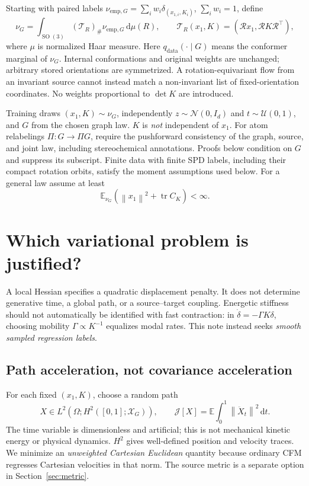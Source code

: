 \documentclass[11pt,letterpaper]{article}
\newcommand{\E}{\mathbb E}
\newcommand{\X}{\mathcal X_G}
\newcommand{\cN}{\mathcal N}
\newcommand{\tr}{\operatorname{tr}}
\newcommand{\SO}{\operatorname{SO}(3)}
\newcommand{\dd}{\,\mathrm d}
\newcommand{\norm}[1]{\left\lVert#1\right\rVert}
\newcommand{\J}{\mathcal J}
\begin{document}
Starting with paired labels $\nu_{\mathrm{emp},G}=\sum_iw_i\delta_{(x_{1,i},K_i)}$, $\sum_iw_i=1$, define
\begin{equation}
\nu_G=\int_{\SO}(\mathcal T_R)_\#\nu_{\mathrm{emp},G}\dd\mu(R),\qquad
\mathcal T_R(x_1,K)=(\mathcal Rx_1,\mathcal RK\mathcal R^\top),
\label{eq:joint}
\end{equation}
where $\mu$ is normalized Haar measure. Here $q_{\mathrm{data}}(\cdot\mid G)$ means the conformer marginal of $\nu_G$. Internal conformations and original weights are unchanged; arbitrary stored orientations are symmetrized. A rotation-equivariant flow from an invariant source cannot instead match a non-invariant list of fixed-orientation coordinates. No weights proportional to $\det K$ are introduced.

Training draws $(x_1,K)\sim\nu_G$, independently $z\sim\cN(0,I_d)$ and $t\sim\mathcal U(0,1)$, and $G$ from the chosen graph law. $K$ is \emph{not} independent of $x_1$. For atom relabelings $\Pi:G\to\Pi G$, require the pushforward consistency of the graph, source, and joint law, including stereochemical annotations. Proofs below condition on $G$ and suppress its subscript. Finite data with finite SPD labels, including their compact rotation orbits, satisfy the moment assumptions used below. For a general law assume at least
\begin{equation}
\E_{\nu_G}(\norm{x_1}^2+\tr C_K)<\infty.
\label{eq:moments}
\end{equation}

\section{Which variational problem is justified?}
\label{sec:objective}

A local Hessian specifies a quadratic displacement penalty. It does not determine generative time, a global path, or a source--target coupling. Energetic stiffness should not automatically be identified with fast contraction: in $\dot\delta=-\Gamma K\delta$, choosing mobility $\Gamma\propto K^{-1}$ equalizes modal rates. This note instead seeks \emph{smooth sampled regression labels}.

\subsection{Path acceleration, not covariance acceleration}
For each fixed $(x_1,K)$, choose a random path
\begin{equation}
X\in L^2(\Omega;H^2([0,1];\X)),\qquad
\J[X]=\E\int_0^1\norm{\ddot X_t}^2\dd t.
\label{eq:objective}
\end{equation}
The time variable is dimensionless and artificial; this is not mechanical kinetic energy or physical dynamics. $H^2$ gives well-defined position and velocity traces. We minimize an \emph{unweighted Cartesian Euclidean} quantity because ordinary CFM regresses Cartesian velocities in that norm. The source metric is a separate option in Section~\ref{sec:metric}.
\end{document}
